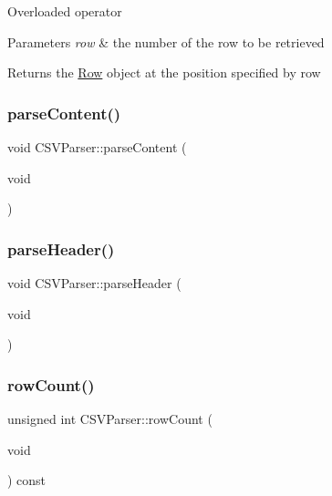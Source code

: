 Overloaded operator 
\begin{DoxyParams}{Parameters}
{\em row} & the number of the row to be retrieved \\
\hline
\end{DoxyParams}
\begin{DoxyReturn}{Returns}
the \hyperlink{class_row}{Row} object at the position specified by row 
\end{DoxyReturn}
\mbox{\label{class_c_s_v_parser_aa403f7d8238903aa0e046a9a091ab968}} 
\subsubsection{\texorpdfstring{parse\+Content()}{parseContent()}}
{\footnotesize\ttfamily void C\+S\+V\+Parser\+::parse\+Content (\begin{DoxyParamCaption}\item[{void}]{ }\end{DoxyParamCaption})\hspace{0.3cm}{\ttfamily [protected]}}

\mbox{\label{class_c_s_v_parser_a8b556e47ecfea188d4c6c630616f5667}} 
\subsubsection{\texorpdfstring{parse\+Header()}{parseHeader()}}
{\footnotesize\ttfamily void C\+S\+V\+Parser\+::parse\+Header (\begin{DoxyParamCaption}\item[{void}]{ }\end{DoxyParamCaption})\hspace{0.3cm}{\ttfamily [protected]}}

\mbox{\label{class_c_s_v_parser_ab7596d8458539a585908d41638672f4c}} 
\subsubsection{\texorpdfstring{row\+Count()}{rowCount()}}
{\footnotesize\ttfamily unsigned int C\+S\+V\+Parser\+::row\+Count (\begin{DoxyParamCaption}\item[{void}]{ }\end{DoxyParamCaption}) const}

